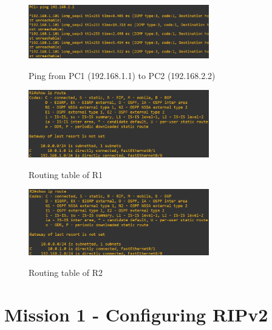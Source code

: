 \documentclass[10pt,a4paper]{ULBreport}
\begin{document}
\begin{figure}[H]
    \caption{Ping from PC1 (192.168.1.1) to PC2 (192.168.2.2)}
    \centering
    \includegraphics[width=0.7\textwidth]{pingPC1PC2.png}
    \label{pingPC1PC2}
\end{figure}

\begin{figure}[H]
    \caption{Routing table of R1}
    \centering
    \includegraphics[width=0.7\textwidth]{routeRC1.png}
    \label{routeR1}
\end{figure}

\begin{figure}[H]
    \caption{Routing table of R2}
    \center
    \includegraphics[width=0.7\textwidth]{routeRC2.png}
    \label{routeR2}
\end{figure}





\chapter{Mission 1 - Configuring RIPv2}
\end{document}
